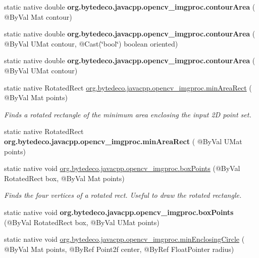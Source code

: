 \begin{DoxyCompactItemize}
static native double {\bfseries org.\+bytedeco.\+javacpp.\+opencv\+\_\+imgproc.\+contour\+Area} ( @By\+Val Mat contour)
\item 
\mbox{\label{group__imgproc__shape_ga8c4e4c69db5ec099b7c3431e05a6ce84}} 
static native double {\bfseries org.\+bytedeco.\+javacpp.\+opencv\+\_\+imgproc.\+contour\+Area} ( @By\+Val U\+Mat contour, @Cast(\char`\"{}bool\char`\"{}) boolean oriented)
\item 
\mbox{\label{group__imgproc__shape_ga0cfde91590f81f0544f40ea3ce2c51bb}} 
static native double {\bfseries org.\+bytedeco.\+javacpp.\+opencv\+\_\+imgproc.\+contour\+Area} ( @By\+Val U\+Mat contour)
\item 
static native Rotated\+Rect \hyperlink{group__imgproc__shape_gae621046d95a8ba9f1e1ce112ab8de61a}{org.\+bytedeco.\+javacpp.\+opencv\+\_\+imgproc.\+min\+Area\+Rect} ( @By\+Val Mat points)
\begin{DoxyCompactList}\small\item\em Finds a rotated rectangle of the minimum area enclosing the input 2D point set. \end{DoxyCompactList}\item 
\mbox{\label{group__imgproc__shape_ga2fcdb1e9ccc31aca2f77dc8812752879}} 
static native Rotated\+Rect {\bfseries org.\+bytedeco.\+javacpp.\+opencv\+\_\+imgproc.\+min\+Area\+Rect} ( @By\+Val U\+Mat points)
\item 
static native void \hyperlink{group__imgproc__shape_ga02ee8d410547c387ed348bbb9c2fc213}{org.\+bytedeco.\+javacpp.\+opencv\+\_\+imgproc.\+box\+Points} (@By\+Val Rotated\+Rect box, @By\+Val Mat points)
\begin{DoxyCompactList}\small\item\em Finds the four vertices of a rotated rect. Useful to draw the rotated rectangle. \end{DoxyCompactList}\item 
\mbox{\label{group__imgproc__shape_ga7e1db9a4fe383c8f67a82ffbba7d95bd}} 
static native void {\bfseries org.\+bytedeco.\+javacpp.\+opencv\+\_\+imgproc.\+box\+Points} (@By\+Val Rotated\+Rect box, @By\+Val U\+Mat points)
\item 
static native void \hyperlink{group__imgproc__shape_ga6247e734952a578322d69260230c4a41}{org.\+bytedeco.\+javacpp.\+opencv\+\_\+imgproc.\+min\+Enclosing\+Circle} ( @By\+Val Mat points, @By\+Ref Point2f center, @By\+Ref Float\+Pointer radius)

\end{DoxyCompactItemize}
